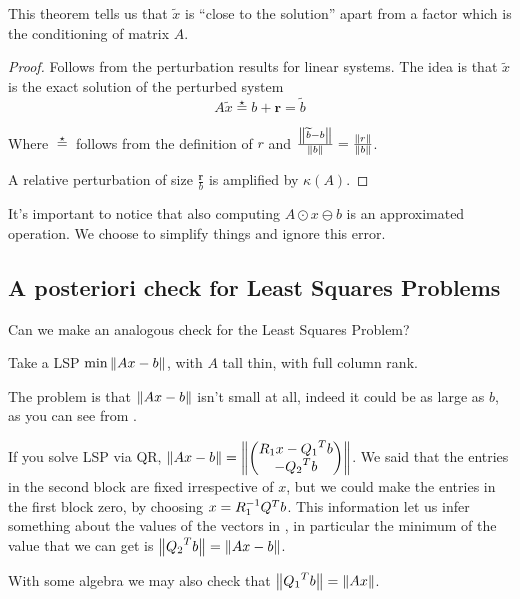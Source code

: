 \documentclass[computational_mathematics.tex]{subfiles}
\begin{document}
This theorem tells us that $\widetilde{x}$ is ``close to the solution'' apart from a factor which is the conditioning of matrix $A$.

\begin{proof}
Follows from the perturbation results for linear systems. The idea is that $\widetilde{x}$ is the exact solution of the perturbed system 
\[
  A\widetilde{x} \stareq b + \mathbf{r} = \widetilde{b}
\]

Where $\stareq$ follows from the definition of $r$ and $\frac{\left\lVert\widetilde{b} - b\right\rVert}{\left\lVert b\right\rVert} = \frac{\left\lVert r\right\rVert}{\left\lVert b\right\rVert}$.

  A relative perturbation of size $\frac{\mathbf{r}}{b}$ is amplified by $\kappa(A)$.
\end{proof}

It's important to notice that also computing $A \odot x \ominus b$ is an approximated operation. We choose to simplify things and ignore this error.

\subsection{A posteriori check for Least Squares Problems}
Can we make an analogous check for the Least Squares Problem?

  Take a LSP $\min \left\lVert Ax-b\right\rVert$, with $A$ tall thin, with full column rank.

  The problem is that $\left\lVert Ax - b\right\rVert$ isn't small at all, indeed it could be as large as $b$, as you can see from .


  \begin{obs}
    If you solve LSP via QR, $\left\lVert Ax - b\right\rVert = \left\lVert\begin{pmatrix} 
    R_1 x - {Q_1}^{T}b\\ -{Q_2}^{T} b \end{pmatrix}\right\rVert$. We said that the entries in the second block are fixed irrespective of $x$, but we could make the entries in the first block zero, by choosing $x=R_1^{-1}{Q}^{T}b$. This information let us infer something about the values of the vectors in , in particular the minimum of the value that we can get is $\left\lVert{Q_2}^{T} b\right\rVert = \left\lVert Ax - b\right\rVert$.

    With some algebra we may also check that $\left\lVert{Q_1}^{T} b\right\rVert = \left\lVert Ax\right\rVert$.
  \end{obs}
\end{document}
